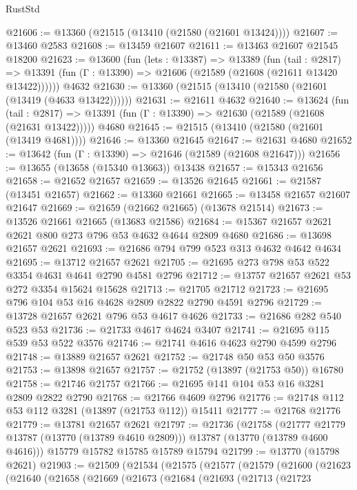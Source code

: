 \begin{lexlean}{RustStd}
\begin{coremodule}
@21606 := @13360 (@21515 (@13410 (@21580 (@21601 @13424))))
@21607 := @13460 @2583
@21608 := @13459 @21607
@21611 := @13463 @21607 @21545 @18200
@21623 := @13600
    (fun (lets : @13387) =>
    @13389
      (fun (tail : @2817) =>
      @13391 (fun (Γ : @13390) => @21606 (@21589 (@21608 (@21611 @13420 @13422))))))
    @4632
@21630 := @13360 (@21515 (@13410 (@21580 (@21601 (@13419 (@4633 @13422))))))
@21631 := @21611 @4632
@21640 := @13624
    (fun (tail : @2817) => @13391 (fun (Γ : @13390) => @21630 (@21589 (@21608 (@21631 @13422)))))
    @4680
@21645 := @21515 (@13410 (@21580 (@21601 (@13419 @4681))))
@21646 := @13360 @21645
@21647 := @21631 @4680
@21652 := @13642 (fun (Γ : @13390) => @21646 (@21589 (@21608 @21647)))
@21656 := @13655 (@13658 (@15340 @13663)) @13438
@21657 := @15343 @21656
@21658 := @21652 @21657
@21659 := @13526 @21645
@21661 := @21587 (@13451 @21657)
@21662 := @13360 @21661
@21665 := @13458 @21657 @21607 @21647
@21669 := @21659 (@21662 @21665) (@13678 @21514)
@21673 := @13526 @21661 @21665 (@13683 @21586)
@21684 := @15367 @21657 @2621 @2621 @800 @273 @796 @53 @4632 @4644 @2809 @4680
@21686 := @13698 @21657 @2621
@21693 := @21686 @794 @799 @523 @313 @4632 @4642 @4634
@21695 := @13712 @21657 @2621
@21705 := @21695 @273 @798 @53 @522 @3354 @4631 @4641 @2790 @4581 @2796
@21712 := @13757 @21657 @2621 @53 @272 @3354 @15624 @15628
@21713 := @21705 @21712
@21723 := @21695 @796 @104 @53 @16 @4628 @2809 @2822 @2790 @4591 @2796
@21729 := @13728 @21657 @2621 @796 @53 @4617 @4626
@21733 := @21686 @282 @540 @523 @53
@21736 := @21733 @4617 @4624 @3407
@21741 := @21695 @115 @539 @53 @522 @3576
@21746 := @21741 @4616 @4623 @2790 @4599 @2796
@21748 := @13889 @21657 @2621
@21752 := @21748 @50 @53 @50 @3576
@21753 := @13898 @21657
@21757 := @21752 (@13897 (@21753 @50)) @16780
@21758 := @21746 @21757
@21766 := @21695 @141 @104 @53 @16 @3281 @2809 @2822 @2790
@21768 := @21766 @4609 @2796
@21776 := @21748 @112 @53 @112 @3281 (@13897 (@21753 @112)) @15411
@21777 := @21768 @21776
@21779 := @13781 @21657 @2621
@21797 := @21736
    (@21758
      (@21777 @21779 @13787 (@13770 (@13789 @4610 @2809)))
      @13787
      (@13770 (@13789 @4600 @4616)))
    @15779
    @15782
    @15785
    @15789
    @15794
@21799 := @13770 (@15798 @2621)
@21903 := @21509
    (@21534
      (@21575
        (@21577
          (@21579
            (@21600
              (@21623
                (@21640
                  (@21658
                    (@21669
                      (@21673
                        (@21684
                          (@21693
                            (@21713
                              (@21723

\end{coremodule}
\end{lexlean}
